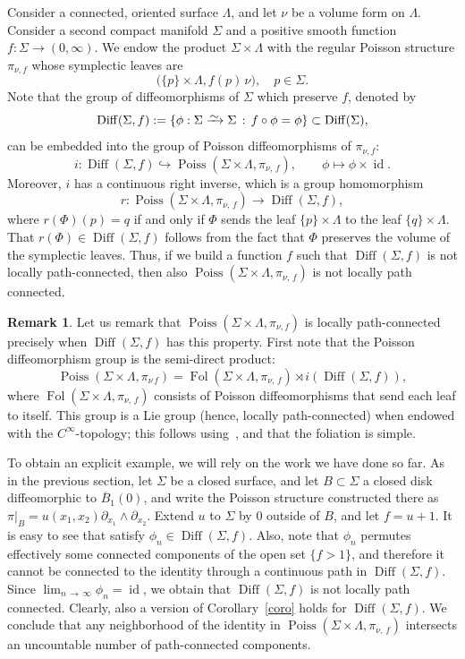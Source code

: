 \documentclass[10pt]{amsart}
\theoremstyle{definition}
\newtheorem{rema}[cdrthm]{Remark}
\newcommand{\diffto}{\xrightarrow{\raisebox{-0.2 em}[0pt][0pt]{\smash{\ensuremath{\sim}}}}}
\DeclareMathOperator{\Poiss}{Poiss}
\DeclareMathOperator{\Diff}{Diff}
\DeclareMathOperator{\id}{id}
\DeclareMathOperator{\Fol}{Fol}
\begin{document}
Consider a connected, oriented surface $\Lambda$, and let $\nu$ be a volume form on $\Lambda$. Consider a second compact manifold $\Sigma$ and a positive smooth function $f:\Sigma\to (0,\infty)$. We endow the product $\Sigma\times
\Lambda$ with the regular Poisson structure $\pi_{\nu, f}$ whose symplectic leaves are
\[
\big(\{p\}\times \Lambda, f(p)\,\nu\big), \quad p\in \Sigma.
\]
Note that the group of diffeomorphisms of $\Sigma$ which preserve $f$, denoted by
\[
\Diff(\Sigma,f):=\left\{\phi:\Sigma\diffto \Sigma\, : \, f\circ \phi=\phi \right\}\subset \Diff(\Sigma),
\]
can be embedded into the group of Poisson diffeomorphisms of $\pi_{\nu, f}$:
\[
i:\Diff(\Sigma,f)\hookrightarrow\Poiss\left(\Sigma\times \Lambda,\pi_{\nu,\,f}\right), \qquad \phi\mapsto \phi\times\id.
\]
Moreover, $i$ has a continuous right inverse, which is a group homomorphism
\[
r:\Poiss\left(\Sigma\times \Lambda,\pi_{\nu,\,f}\right)\to \Diff\left(\Sigma,f\right),
\]
where $r(\Phi)(p)=q$ if and only if $\Phi$ sends the leaf $\{p\}\times
\Lambda$ to the leaf $\{q\}\times \Lambda$. That $r(\Phi)\in
\Diff(\Sigma,f)$ follows from the fact that $\Phi$ preserves the volume of the symplectic leaves. Thus, if we build a function $f$ such that $\Diff(\Sigma,f)$ is not locally path-connected, then also $\Poiss(\Sigma\times \Lambda,\pi_{\nu,\,f})$ is not locally path connected.

\begin{rema}
Let us remark that $\Poiss(\Sigma\times \Lambda,\pi_{\nu, f})$ is locally path-connected precisely when $\Diff(\Sigma,f)$ has this property. First note that the Poisson diffeomorphism group is the semi-direct product:
\[
\Poiss\left(\Sigma\times \Lambda,\pi_{\nu\,f}\right)=\Fol\left(\Sigma\times \Lambda,\pi_{\nu,\,f}\right)\rtimes i\left(\Diff\left(\Sigma,f\right)\right),
\]
where $\Fol(\Sigma\times \Lambda,\pi_{\nu,\,f})$ consists of Poisson diffeomorphisms that send each leaf to itself. This group is a Lie group (hence, locally path-connected) when endowed with the $C^{\infty}$-topology; this follows using~\cite{Rybicki}, and that the foliation is simple.
\end{rema}

To obtain an explicit example, we will rely on the work we have done so far. As in the previous section, let $\Sigma$ be a closed surface, and let $B\subset \Sigma$ a closed disk diffeomorphic to $\overline{B}_1(0)$, and write the Poisson structure constructed there as $\pi|_B=u(x_1,x_2)\partial_{x_1}\wedge\partial_{x_2}$. Extend $u$ to $\Sigma$ by $0$ outside of $B$, and let $f=u+1$. It is easy to see that satisfy $\phi_n\in \Diff(\Sigma,f)$. Also, note that $\phi_n$ permutes effectively some connected components of the open set $\{f>1\}$, and therefore it cannot be connected to the identity through a continuous path in $\Diff(\Sigma,f)$. Since $\lim_{n\,\to\,\infty}\phi_n=\id$, we obtain that $\Diff(\Sigma,f)$ is not locally path connected. Clearly, also a version of Corollary~\ref{coro} holds for $\Diff(\Sigma,f)$. We conclude that any neighborhood of the identity in $\Poiss(\Sigma\times \Lambda,\pi_{\nu,\,f})$ intersects an uncountable number of path-connected components.
\end{document}
